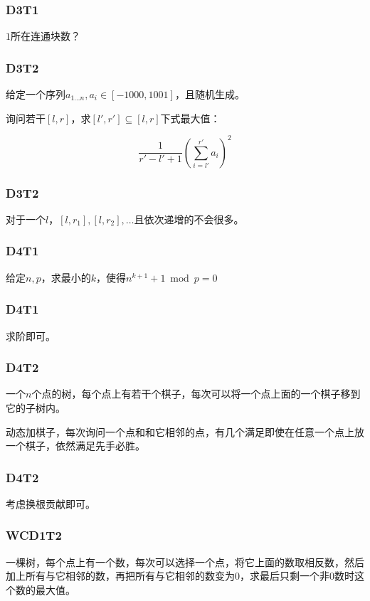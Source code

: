 \documentclass[10pt]{beamer}
\begin{document}
	\clearpage
	\begin{frame}
		\frametitle{D3T1}
	
		$1$所在连通块数？
	
	\end{frame}
	\clearpage
	\begin{frame}
		\frametitle{D3T2}
	
		给定一个序列$a_{1\dots n},a_i\in[-1000,1001]$，且随机生成。

		询问若干$[l,r]$，求$[l',r']\subseteq [l,r]$下式最大值：

		$$
		\dfrac{1}{r'-l'+1}(\sum_{i=l'}^{r'} a_i)^2
		$$
	
	\end{frame}
	\clearpage
	\begin{frame}
		\frametitle{D3T2}
	
		对于一个$l$，$[l,r_1],[l,r_2],\dots$且依次递增的不会很多。
	
	\end{frame}
	\clearpage
	\begin{frame}
		\frametitle{D4T1}
	
		给定$n,p$，求最小的$k$，使得$n^{k+1}+1\bmod p=0$
	
	\end{frame}
	\clearpage
	\begin{frame}
		\frametitle{D4T1}
	
		求阶即可。
	
	\end{frame}
	\clearpage
	\begin{frame}
		\frametitle{D4T2}
	
		一个$n$个点的树，每个点上有若干个棋子，每次可以将一个点上面的一个棋子移到它的子树内。

		动态加棋子，每次询问一个点和和它相邻的点，有几个满足即使在任意一个点上放一个棋子，依然满足先手必胜。
	
	\end{frame}
	\clearpage
	\begin{frame}
		\frametitle{D4T2}
	
		考虑换根贡献即可。
	
	\end{frame}
	\clearpage
	\begin{frame}
		\frametitle{WCD1T2}
	
		一棵树，每个点上有一个数，每次可以选择一个点，将它上面的数取相反数，然后加上所有与它相邻的数，再把所有与它相邻的数变为$0$，求最后只剩一个非$0$数时这个数的最大值。
	
	\end{frame}
\end{document}
